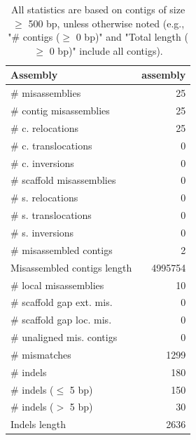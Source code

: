 \documentclass[12pt,a4paper]{article}
\begin{document}
\begin{table}[ht]
\begin{center}
\caption{All statistics are based on contigs of size $\geq$ 500 bp, unless otherwise noted (e.g., "\# contigs ($\geq$ 0 bp)" and "Total length ($\geq$ 0 bp)" include all contigs).}
\begin{tabular}{|l*{1}{|r}|}
\hline
Assembly & assembly \\ \hline
\# misassemblies & 25 \\ \hline
\hspace{2mm}\# contig misassemblies & 25 \\ \hline
\hspace{5mm}\# c. relocations & 25 \\ \hline
\hspace{5mm}\# c. translocations & 0 \\ \hline
\hspace{5mm}\# c. inversions & 0 \\ \hline
\hspace{2mm}\# scaffold misassemblies & 0 \\ \hline
\hspace{5mm}\# s. relocations & 0 \\ \hline
\hspace{5mm}\# s. translocations & 0 \\ \hline
\hspace{5mm}\# s. inversions & 0 \\ \hline
\# misassembled contigs & 2 \\ \hline
Misassembled contigs length & 4995754 \\ \hline
\# local misassemblies & 10 \\ \hline
\# scaffold gap ext. mis. & 0 \\ \hline
\# scaffold gap loc. mis. & 0 \\ \hline
\# unaligned mis. contigs & 0 \\ \hline
\# mismatches & 1299 \\ \hline
\# indels & 180 \\ \hline
\hspace{5mm}\# indels ($\leq$ 5 bp) & 150 \\ \hline
\hspace{5mm}\# indels ($>$ 5 bp) & 30 \\ \hline
Indels length & 2636 \\ \hline
\end{tabular}
\end{center}
\end{table}
\end{document}
